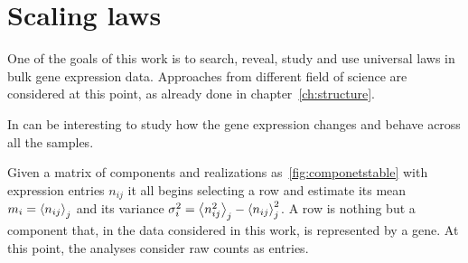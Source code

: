 \chapter{Scaling laws}\label{ch:scalinglaws}
One of the goals of this work is to search, reveal, study and use universal laws in bulk gene expression data. Approaches from different field of science are considered at this point, as already done in chapter~\ref{ch:structure}.~\nocite{altmann2016statistical}

In can be interesting to study how the gene expression changes and behave across all the samples.

Given a matrix of components and realizations as~\ref{fig:componetstable} with expression entries $n_{i j}$ it all begins selecting a row and estimate its mean $m_i=\left\langle n_{i
 j}\right\rangle_j$ and its variance $\sigma^2_{i}=\left\langle n_{i j}^2\right\rangle_j - \left\langle n_{i j}\right\rangle^2_j$. A row is nothing but a component that, in the data considered in this work, is represented by a gene. At this point, the analyses consider raw counts as entries.  


\FloatBarrier


